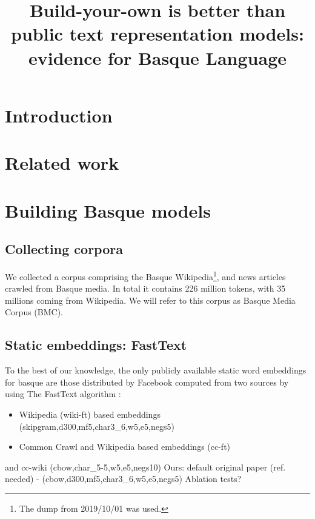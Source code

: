 \documentclass[10pt, a4paper]{article}
\title{Build-your-own is better than public text representation models: evidence for Basque Language}
\begin{document}
\maketitleabstract

\section{Introduction}
\label{sec:introduction}



\section{Related work}
\label{sec:related-work}



\section{Building Basque models}
\label{sec:build-basq-models}

\subsection{Collecting corpora}
\label{sec:build-basq-models:corpora}
 
 We collected a corpus comprising the Basque Wikipedia\footnote{The dump from 2019/10/01 was used.}, and news articles crawled from Basque media. In total it contains 226 million tokens, with 35 millions coming from Wikipedia. We will refer to this corpus as Basque Media Corpus (BMC).
 


 
\subsection{Static embeddings: FastText}
\label{sec:build-basq-models:static}

To the best of our knowledge, the only publicly available static word embeddings for basque are those distributed by Facebook computed from two sources by using The FastText algorithm \cite{}: 
\begin{itemize}
    \item Wikipedia (wiki-ft) based embeddings \cite{fasttext1_bojanowski2017enriching} (skipgram,d300,mf5,char3\_6,w5,e5,negs5)
    \item Common Crawl and Wikipedia based embeddings (cc-ft) \cite{fasttext2_grave2018learning}
\end{itemize} and cc-wiki (cbow,char\_5-5,w5,e5,negs10)
Ours: default original paper (ref. needed) -  (cbow,d300,mf5,char3\_6,w5,e5,negs5)
Ablation tests?
\end{document}
